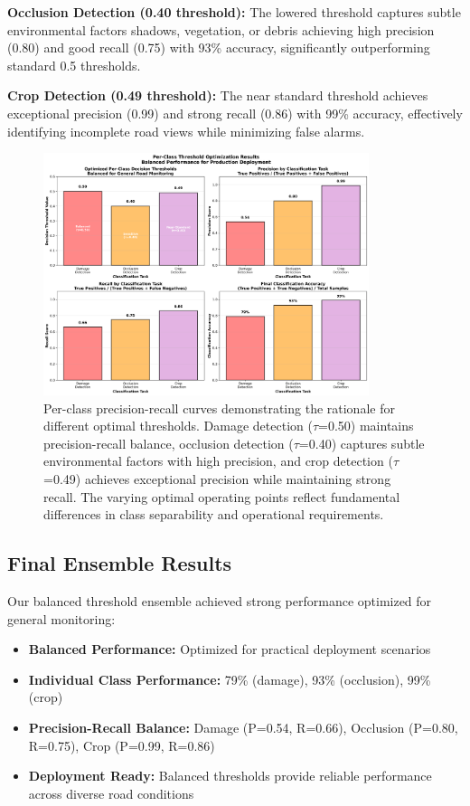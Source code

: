 \documentclass[12pt]{article}
\begin{document}
\textbf{Occlusion Detection (0.40 threshold):} The lowered threshold captures subtle environmental factors shadows, vegetation, or debris achieving high precision (0.80) and good recall (0.75) with 93\% accuracy, significantly outperforming standard 0.5 thresholds.

\textbf{Crop Detection (0.49 threshold):} The near standard threshold achieves exceptional precision (0.99) and strong recall (0.86) with 99\% accuracy, effectively identifying incomplete road views while minimizing false alarms.

\begin{figure}[!htb]
\centering
\includegraphics[width=0.85\textwidth]{images/threshold_optimization_analysis.png}
\caption{Per-class precision-recall curves demonstrating the rationale for different optimal thresholds. Damage detection ($\tau$=0.50) maintains precision-recall balance, occlusion detection ($\tau$=0.40) captures subtle environmental factors with high precision, and crop detection ($\tau$=0.49) achieves exceptional precision while maintaining strong recall. The varying optimal operating points reflect fundamental differences in class separability and operational requirements.}
\end{figure}

\subsection{Final Ensemble Results}

Our balanced threshold ensemble achieved strong performance optimized for general monitoring:

\begin{itemize}[itemsep=1pt,parsep=0pt,topsep=3pt]
\item \textbf{Balanced Performance:} Optimized for practical deployment scenarios
\item \textbf{Individual Class Performance:} 79\% (damage), 93\% (occlusion), 99\% (crop)
\item \textbf{Precision-Recall Balance:} Damage (P=0.54, R=0.66), Occlusion (P=0.80, R=0.75), Crop (P=0.99, R=0.86)
\item \textbf{Deployment Ready:} Balanced thresholds provide reliable performance across diverse road conditions
\end{itemize}
\end{document}
